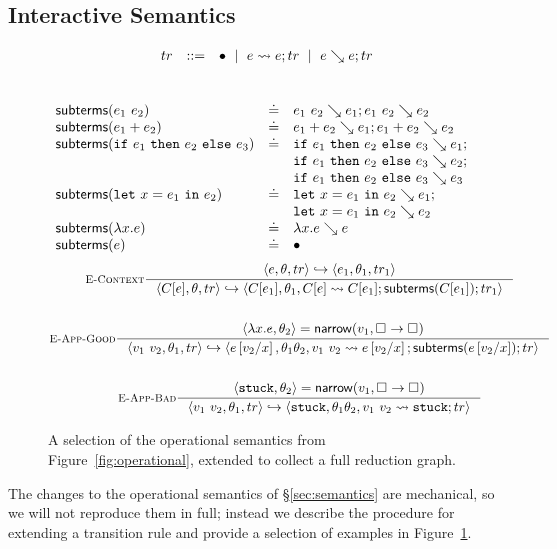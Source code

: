 \subsection{Interactive Semantics}
\label{sec:inter-semant}
%
\begin{figure}[t]
$$
\begin{array}{rrcl}
  & tr & ::= & \bullet \ \mid \  e \leadsto e; tr \ \mid \  e \searrow e; tr
\end{array}
$$
\\
\relDescription{\subtermssym}
\begin{gather*}
\begin{array}{lcl}
\mathsf{subterms}(e_1 \ e_2)   & \doteq & e_1 \ e_2 \searrow e_1; e_1 \ e_2 \searrow e_2 \\
\mathsf{subterms}(e_1 + e_2)   & \doteq & e_1 + e_2 \searrow e_1; e_1 + e_2 \searrow e_2 \\
\mathsf{subterms}(\mathtt{if}\ e_1\ \mathtt{then}\ e_2\ \mathtt{else}\ e_3)   & \doteq & \mathtt{if}\ e_1\ \mathtt{then}\ e_2\ \mathtt{else}\ e_3 \searrow e_1; \\
                                &        & \mathtt{if}\ e_1\ \mathtt{then}\ e_2\ \mathtt{else}\ e_3 \searrow e_2; \\
                                &        & \mathtt{if}\ e_1\ \mathtt{then}\ e_2\ \mathtt{else}\ e_3 \searrow e_3 \\
\mathsf{subterms}(\mathtt{let}\ x = e_1\ \mathtt{in}\ e_2)   & \doteq & \mathtt{let}\ x = e_1\ \mathtt{in}\ e_2 \searrow e_1; \\
                                &        & \mathtt{let}\ x = e_1\ \mathtt{in}\ e_2 \searrow e_2 \\
\mathsf{subterms}(\lambda x. e)       & \doteq & \lambda x. e \searrow e \\
\mathsf{subterms}(e)                 & \doteq & \bullet
\end{array}
\end{gather*}
\begin{gather*}
\inference[\recontext]
  {\stepg{e}{\su}{\tr}{e_1}{\su_1}{\tr_1}}
  {\stepg{C[e]}{\su}{\tr}{C[e_1]}{\su_1}{\singlestep{C[e]}{C[e_1]}; \subterms{C[e_1]}; \tr_1}}
\\ \\
\inference[\reappgood]
  {\pair{\efun{x}{e}}{\su_2} = \force{v_1}{\tfun{\thole{}}{\thole{}}}}
  {\stepg{\eapp{v_1}{v_2}}{\su_1}{\tr}
         {e\sub{x}{v_2}}{\su_1\su_2}{\singlestep{\eapp{v_1}{v_2}}{e\sub{x}{v_2}}; \subterms{e\sub{x}{v_2}}; \tr}}
\\ \\
\inference[\reappbad]
  {\pair{\stuck}{\su_2} = \force{v_1}{\tfun{\thole{}}{\thole{}}}}
  {\stepg{\eapp{v_1}{v_2}}{\su_1}{\tr}{\stuck}{\su_1\su_2}{\singlestep{\eapp{v_1}{v_2}}{\stuck}; \tr}}
\end{gather*}
\caption{A selection of the operational semantics from
  Figure~\ref{fig:operational}, extended to collect a full reduction
  graph.}
\label{fig:interactive}
\end{figure}
%
The changes to the operational semantics of \S\ref{sec:semantics} are
mechanical, so we will not reproduce them in full; instead we describe
the procedure for extending a transition rule and provide a selection of
examples in Figure~\ref{fig:interactive}.

